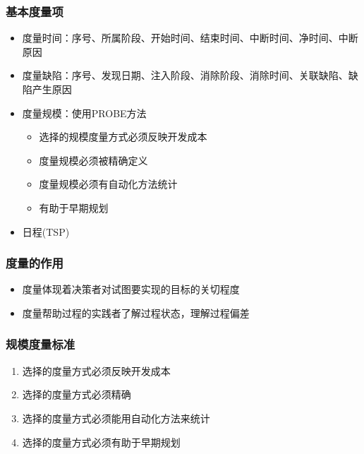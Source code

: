 \subsubsection{基本度量项}
\begin{itemize}
    \item 度量时间：序号、所属阶段、开始时间、结束时间、中断时间、净时间、中断原因
    \item 度量缺陷：序号、发现日期、注入阶段、消除阶段、消除时间、关联缺陷、缺陷产生原因
    \item 度量规模：使用PROBE方法
    \vspace{-0.8em}
    \begin{multicols}{2}
        \begin{itemize}
            \item 选择的规模度量方式必须反映开发成本
            \item 度量规模必须被精确定义
            \item 度量规模必须有自动化方法统计
            \item 有助于早期规划
        \end{itemize}
    \end{multicols}
    \vspace{-1em}
    \item 日程(TSP)
\end{itemize}

\subsubsection{度量的作用}
\begin{itemize}
    \item 度量体现着决策者对试图要实现的目标的关切程度
    \item 度量帮助过程的实践者了解过程状态，理解过程偏差
\end{itemize}

\subsubsection{规模度量标准}
\vspace{-0.8em}
\begin{multicols}{2}
    \begin{enumerate}[label=\arabic*.]
        \item 选择的度量方式必须反映开发成本
        \item 选择的度量方式必须精确
        \item 选择的度量方式必须能用自动化方法来统计
        \item 选择的度量方式必须有助于早期规划
    \end{enumerate}
\end{multicols}
\vspace{-1em}

